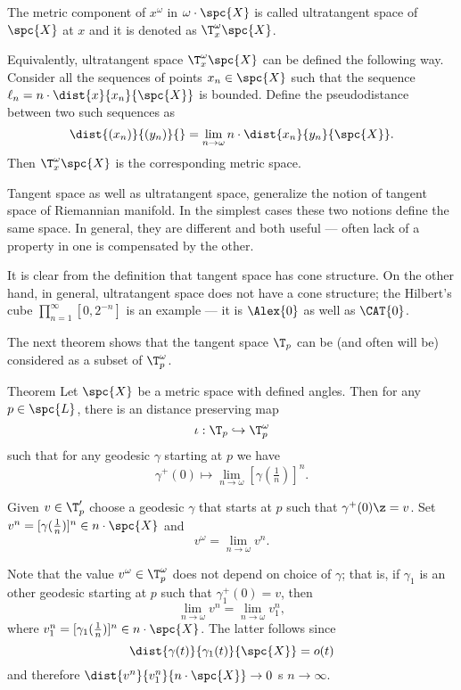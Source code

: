 The metric component of $x^\omega$ in $\omega\cdot\spc{X}$ is called ultratangent space of $\spc{X}$ at $x$ and it is denoted as $\T^\omega_x\spc{X}$.

Equivalently, ultratangent space $\T^\omega_x\spc{X}$ can be defined the following way.
Consider all the sequences of points $x_n\in \spc{X}$ such that
the sequence $\ell_n=n\cdot\dist{x}{x_n}{\spc{X}}$ is bounded.
Define the pseudodistance between two such sequences as 
\[\dist{(x_n)}{(y_n)}{}
=
\lim_{n\to\omega}n\cdot\dist{x_n}{y_n}{\spc{X}}.\]
Then $\T^\omega_x\spc{X}$ is the corresponding metric space.

Tangent space as well as ultratangent space, 
generalize the notion of tangent space of Riemannian manifold.
In the simplest cases these two notions define the same space.
In general, they are different and both useful ---
often lack of a property in one is compensated by the other.

It is clear from the definition that tangent space has cone structure.
On the other hand, in general, ultratangent space does not have a cone structure; 
the Hilbert's cube $\prod_{n=1}^\infty[0,2^{-n}]$ is an example --- it is $\Alex{0}$ as well as $\CAT{0}$.

The next theorem shows that the tangent space $\T_p$ can be (and often will be) considered as a subset of  $\T^\omega_p$.

\begin{thm}{Theorem}\label{thm:tangent-ultratangent}
\label{thm:T-in-T^w} 
Let $\spc{X}$ be a metric space with defined angles.
Then for any $p\in \spc{L}$, there is an distance preserving map 
\[\iota:\T_p\hookrightarrow \T^\omega_p\] 
such that for any geodesic $\gamma$ starting at $p$
we have 
\[\gamma^+(0)\mapsto \lim_{n\to\omega}[\gamma(\tfrac1n)]^n.\]

\end{thm}

Given $v\in \T'_p$ 
choose a geodesic $\gamma$ that starts at $p$ such that $\gamma^+(0)\z=v$.
Set $v^n=[\gamma(\tfrac1n)]^n\in n\cdot \spc{X}$ and 
\[v^\omega=\lim_{n\to\omega}v^n.\]

Note that the value $v^\omega\in\T^\omega_p$ does not depend on choice of $\gamma$;
that is, if $\gamma_1$ is an other geodesic starting at $p$ such that $\gamma_1^+(0)=v$,
then 
\[\lim_{n\to\omega}v^n=\lim_{n\to\omega}v_1^n,\]
where $v_1^n=[\gamma_1(\tfrac1n)]^n\in n\cdot \spc{X}$.
The latter follows since
\[\dist{\gamma(t)}{\gamma_1(t)}{\spc{X}}=o(t)\]
and therefore $\dist{v^n}{v_1^n}{n\cdot \spc{X}}\to 0$ s $n\to\infty$.



